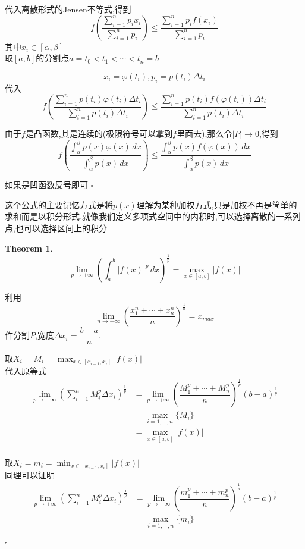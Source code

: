 \documentclass[11pt,hyperref,a4paper,UTF8]{ctexart}
\newtheorem{theorem}{Theorem}[subsection]
\newenvironment{cproof}{%
\heiti{证明}\kaishu
}{%
  \hfill $\square$
  \par\bigskip
}
\newcommand{\parameter}[1]{\left(#1\right)}
\newcommand{\abs}[1]{\left|#1\right|}
\begin{document}
\begin{CJK}{UTF8}{gkai}
\begin{cproof}
代入离散形式的Jensen不等式,得到
\[f\parameter{\dfrac{\sum_{i =1 }^{n} p_i x_i}{\sum_{i =1 }^{n} p_i}} \leq \dfrac{\sum_{i =1 }^{n} p_i f(x_i)}{\sum_{i =1 }^{n} p_i}\]
其中$x_i \in [\alpha,\beta]$\\

取$[a,b]$的分割点$a = t_0 < t_1 < \cdots < t_n = b$

\[x_i = \varphi(t_i), p_i = p(t_i) \Delta t_i\]
代入
\[f\parameter{\dfrac{\sum_{i =1 }^{n} p(t_i)  \varphi(t_i) \Delta t_i}{\sum_{i =1 }^{n} p(t_i) \Delta t_i}} \leq \dfrac{\sum_{i =1 }^{n} p(t_i)  f(\varphi(t_i)) \Delta t_i}{\sum_{i =1 }^{n} p(t_i) \Delta t_i}\]

由于$f$是凸函数,其是连续的(极限符号可以拿到$f$里面去),那么令$|P| \to 0$,得到
\[f\parameter{\dfrac{\int_{\alpha}^{\beta} p(x) \varphi(x)\,dx}{\int_{\alpha}^{\beta} p(x) \, dx}} \leq \dfrac{\int_{\alpha}^{\beta} p(x)f(\varphi(x)) \, dx }{\int_{\alpha}^{\beta}p(x) \,dx}\]

如果是凹函数反号即可
\end{cproof}

这个公式的主要记忆方式是将$p(x)$理解为某种加权方式,只是加权不再是简单的求和而是以积分形式,就像我们定义多项式空间中的内积时,可以选择离散的一系列点,也可以选择区间上的积分

\begin{theorem}
  \[\lim_{p \to + \infty} \parameter{\int_{a}^{b} |f(x)|^p \, dx}^{\frac{1}{p}} = \max_{x\in[a,b]}\abs{f(x)}\]
\end{theorem}

\begin{cproof}
利用
\[\lim_{n \to +\infty} \parameter{\dfrac{x_1^n + \cdots + x_n^n}{n}}^{\frac{1}{n}} = x_{max}\]
作分割$P$,宽度$\Delta x_i = \dfrac{b - a}{n}$,

取$X_i = M_i = \max_{x\in[x_{i - 1}, x_i]}\abs{f(x)}$\\
代入原等式
\[
\begin{aligned}
  \lim_{p \to +\infty} \parameter{\sum_{i = 1}^{n} M_i^p \Delta x_i}^{\frac{1}{p}} &= \lim_{p \to +\infty} \parameter{\dfrac{M_1^p +\cdots +M_n^p}{n}}^{\frac{1}{p}} (b - a)^{\frac{1}{p}}\\
  &= \max_{i = 1,\cdots ,n}\{M_i\}\\
  &= \max_{x\in[a,b]}\abs{f(x)}\\
\end{aligned}  
  \]

取$X_i = m_i = \min_{x\in[x_{i - 1}, x_i]}\abs{f(x)}$\\
同理可以证明
\[
\begin{aligned}
  \lim_{p \to +\infty} \parameter{\sum_{i = 1}^{n} M_i^p \Delta x_i}^{\frac{1}{p}} &= \lim_{p \to +\infty} \parameter{\dfrac{m_1^p +\cdots +m_n^p}{n}}^{\frac{1}{p}} (b - a)^{\frac{1}{p}}\\
  &= \max_{i = 1,\cdots ,n}\{m_i\}\\
\end{aligned}  
  \]


\end{cproof}
\end{CJK}
\end{document}

